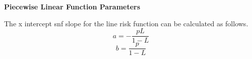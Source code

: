 \textbf{Piecewise Linear Function Parameters}

The x intercept snf slope for the line risk function can be calculated as follows.\[a = -\frac{pL}{1-L}\] \[b = \frac{p}{1-L}\]

